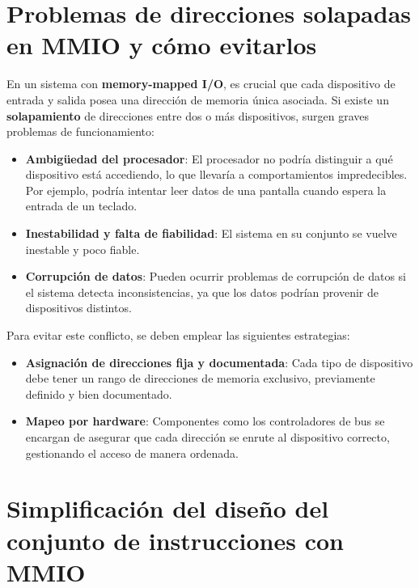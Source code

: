\documentclass{article}
\begin{document}
	\section{Problemas de direcciones solapadas en MMIO y cómo evitarlos}
	
	En un sistema con \textbf{memory-mapped I/O}, es crucial que cada dispositivo de entrada y salida posea una dirección de memoria única asociada. Si existe un \textbf{solapamiento} de direcciones entre dos o más dispositivos, surgen graves problemas de funcionamiento:
	\begin{itemize}
		\item \textbf{Ambigüedad del procesador}: El procesador no podría distinguir a qué dispositivo está accediendo, lo que llevaría a comportamientos impredecibles. Por ejemplo, podría intentar leer datos de una pantalla cuando espera la entrada de un teclado.
		\item \textbf{Inestabilidad y falta de fiabilidad}: El sistema en su conjunto se vuelve inestable y poco fiable.
		\item \textbf{Corrupción de datos}: Pueden ocurrir problemas de corrupción de datos si el sistema detecta inconsistencias, ya que los datos podrían provenir de dispositivos distintos.
	\end{itemize}
	
	Para evitar este conflicto, se deben emplear las siguientes estrategias:
	\begin{itemize}
		\item \textbf{Asignación de direcciones fija y documentada}: Cada tipo de dispositivo debe tener un rango de direcciones de memoria exclusivo, previamente definido y bien documentado.
		\item \textbf{Mapeo por hardware}: Componentes como los controladores de bus se encargan de asegurar que cada dirección se enrute al dispositivo correcto, gestionando el acceso de manera ordenada.
	\end{itemize}
	
	\section{Simplificación del diseño del conjunto de instrucciones con MMIO}
	
\end{document}
